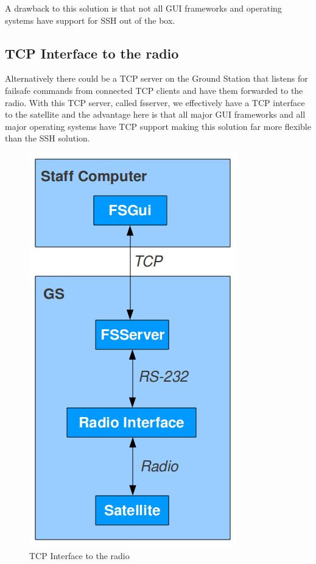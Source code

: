 A drawback to this solution is that not all GUI frameworks and operating systems have support for SSH out of the box.

\subsection{TCP Interface to the radio}
Alternatively there could be a TCP server on the Ground Station that listens for failsafe commands from connected TCP clients and have them forwarded to the radio. With this TCP server, called fsserver, we effectively have a TCP interface to the satellite and the advantage here is that all major GUI frameworks and all major operating systems have TCP support making this solution far more flexible than the SSH solution.

\begin{figure}[h!] \centering
	\includegraphics[scale=0.5]{img/tcp_interface_to_the_radio}
  \caption{TCP Interface to the radio}
\end{figure}

